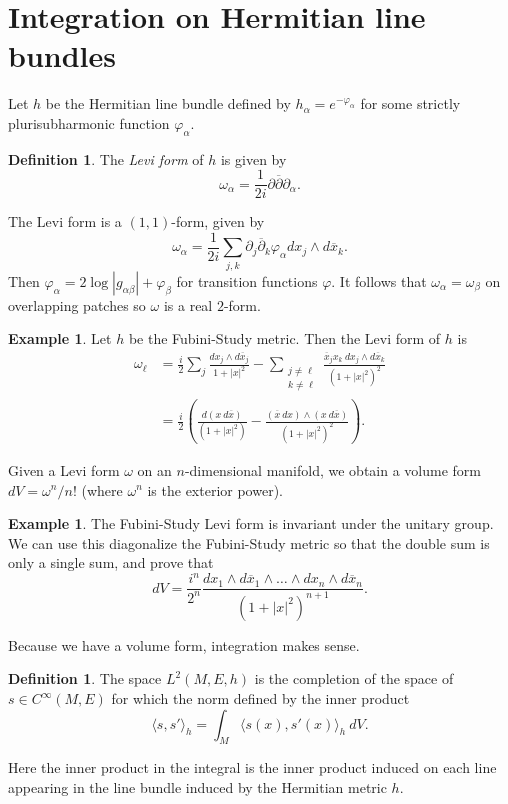 \documentclass[12pt]{report}
\newcommand{\dbar}{\overline\partial}
\newcommand{\dfn}[1]{\emph{#1}\index{#1}}
\theoremstyle{definition}
\newtheorem{definition}[theorem]{Definition}
\newtheorem{example}[theorem]{Example}
\begin{document}
\section{Integration on Hermitian line bundles}
Let $h$ be the Hermitian line bundle defined by $h_\alpha = e^{-\varphi_\alpha}$ for some strictly plurisubharmonic function $\varphi_\alpha$.
\begin{definition}
The \dfn{Levi form} of $h$ is given by
$$\omega_\alpha = \frac{1}{2i}\partial\dbar \partial_\alpha.$$
\end{definition}
The Levi form is a $(1, 1)$-form, given by
$$\omega_\alpha = \frac{1}{2i} \sum_{j,k} \partial_j\dbar_k \varphi_\alpha dx_j \wedge d\overline x_k.$$
Then
$\varphi_\alpha = 2\log|g_{\alpha\beta}| + \varphi_\beta$ for transition functions $\varphi$. It follows that $\omega_\alpha = \omega_\beta$ on overlapping patches so $\omega$ is a real $2$-form.

\begin{example}
    Let $h$ be the Fubini-Study metric. Then the Levi form of $h$ is
\begin{align*}\omega_\ell &= \frac{i}{2} \sum_j \frac{dx_j \wedge d\overline x_j}{1 + |x|^2} - \sum_{\substack{j \neq \ell\\k\neq \ell}} \frac{\overline x_j x_k ~dx_j \wedge d\overline x_k}{(1+|x|^2)^2}\\
    &= \frac{i}{2}\left(\frac{d(x~d\overline x)}{(1 + |x|^2)} - \frac{(\overline x ~dx)\wedge(x ~d\overline x)}{(1 + |x|^2)^2}\right).
\end{align*}
\end{example}

Given a Levi form $\omega$ on an $n$-dimensional manifold, we obtain a volume form $dV = \omega^n/n!$ (where $\omega^n$ is the exterior power).
\begin{example}
    The Fubini-Study Levi form is invariant under the unitary group. We can use this diagonalize the Fubini-Study metric so that the double sum is only a single sum, and prove that
    $$dV = \frac{i^n}{2^n} \frac{dx_1 \wedge d\overline x_1 \wedge \dots \wedge dx_n \wedge d\overline x_n}{(1+|x|^2)^{n+1}}.$$
\end{example}
Because we have a volume form, integration makes sense.
\begin{definition}
    The space $L^2(M, E, h)$ is the completion of the space of $s \in C^\infty(M, E)$ for which the norm defined by the inner product
    $$\langle s, s'\rangle_h = \int_M \langle s(x), s'(x)\rangle_h ~dV.$$
\end{definition}
Here the inner product in the integral is the inner product induced on each line appearing in the line bundle induced by the Hermitian metric $h$.
\end{document}
